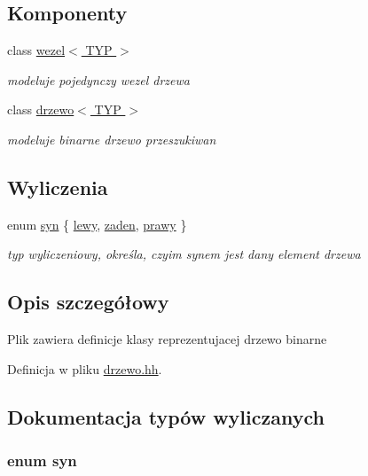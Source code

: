 \subsection*{\-Komponenty}
\begin{DoxyCompactItemize}
\item 
class \hyperlink{classwezel}{wezel$<$ T\-Y\-P $>$}
\begin{DoxyCompactList}\small\item\em modeluje pojedynczy wezel drzewa \end{DoxyCompactList}\item 
class \hyperlink{classdrzewo}{drzewo$<$ T\-Y\-P $>$}
\begin{DoxyCompactList}\small\item\em modeluje binarne drzewo przeszukiwan \end{DoxyCompactList}\end{DoxyCompactItemize}
\subsection*{\-Wyliczenia}
\begin{DoxyCompactItemize}
\item 
enum \hyperlink{drzewo_8hh_a9bf0b5cfb3ec8e645ac2e89e92db4361}{syn} \{ \hyperlink{drzewo_8hh_a9bf0b5cfb3ec8e645ac2e89e92db4361abbc80c0ed35ca719378ba12902e0e707}{lewy}, 
\hyperlink{drzewo_8hh_a9bf0b5cfb3ec8e645ac2e89e92db4361aa54bc1808862835bcdbbbb54651e3895}{zaden}, 
\hyperlink{drzewo_8hh_a9bf0b5cfb3ec8e645ac2e89e92db4361af44652ccf1abf2a5d5670ba455a1b38e}{prawy}
 \}
\begin{DoxyCompactList}\small\item\em typ wyliczeniowy, określa, czyim synem jest dany element drzewa \end{DoxyCompactList}\end{DoxyCompactItemize}


\subsection{\-Opis szczegółowy}
\-Plik zawiera definicje klasy reprezentujacej drzewo binarne 

\-Definicja w pliku \hyperlink{drzewo_8hh_source}{drzewo.\-hh}.



\subsection{\-Dokumentacja typów wyliczanych}
\hypertarget{drzewo_8hh_a9bf0b5cfb3ec8e645ac2e89e92db4361}{
\subsubsection[{syn}]{\setlength{\rightskip}{0pt plus 5cm}enum {\bf syn}}}\label{drzewo_8hh_a9bf0b5cfb3ec8e645ac2e89e92db4361}


